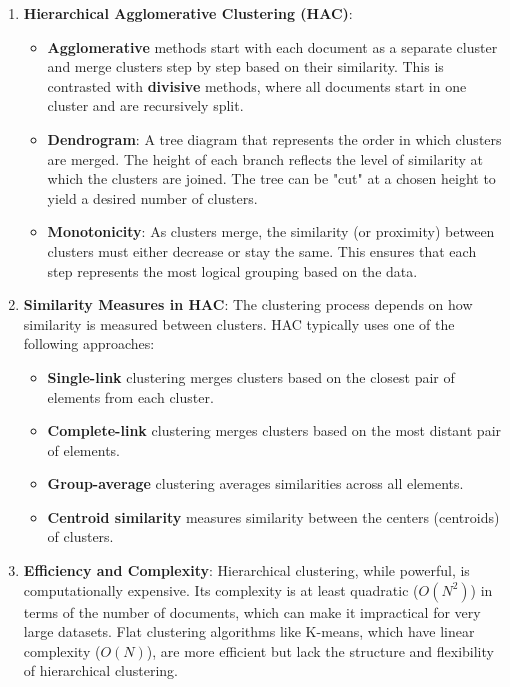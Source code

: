 \documentclass{article}
\begin{document}
\begin{enumerate}
    \item \textbf{Hierarchical Agglomerative Clustering (HAC)}:
    \begin{itemize}
        \item \textbf{Agglomerative} methods start with each document as a separate cluster and merge clusters step by step based on their similarity. This is contrasted with \textbf{divisive} methods, where all documents start in one cluster and are recursively split.
        \item \textbf{Dendrogram}: A tree diagram that represents the order in which clusters are merged. The height of each branch reflects the level of similarity at which the clusters are joined. The tree can be "cut" at a chosen height to yield a desired number of clusters.
        \item \textbf{Monotonicity}: As clusters merge, the similarity (or proximity) between clusters must either decrease or stay the same. This ensures that each step represents the most logical grouping based on the data.
    \end{itemize}

    \item \textbf{Similarity Measures in HAC}:
    The clustering process depends on how similarity is measured between clusters. HAC typically uses one of the following approaches:
    \begin{itemize}
        \item \textbf{Single-link} clustering merges clusters based on the closest pair of elements from each cluster.
        \item \textbf{Complete-link} clustering merges clusters based on the most distant pair of elements.
        \item \textbf{Group-average} clustering averages similarities across all elements.
        \item \textbf{Centroid similarity} measures similarity between the centers (centroids) of clusters.
    \end{itemize}

    \item \textbf{Efficiency and Complexity}:  
    Hierarchical clustering, while powerful, is computationally expensive. Its complexity is at least quadratic ($O(N^2)$) in terms of the number of documents, which can make it impractical for very large datasets. Flat clustering algorithms like K-means, which have linear complexity ($O(N)$), are more efficient but lack the structure and flexibility of hierarchical clustering.


\end{enumerate}
\end{document}
